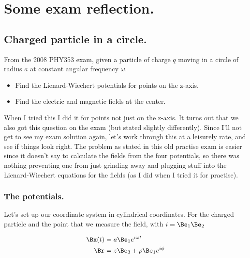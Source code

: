 
%

\chapter{Some exam reflection.}
\label{chap:relativisticElectrodynamicsExamReflection}
{}
\date{April 13, 2011}

\beginArtWithToc

\section{Charged particle in a circle.}

From the 2008 PHY353 exam, given a particle of charge $q$ moving in a circle of radius $a$ at constant angular frequency $\omega$.

\begin{itemize}
\item Find the Lienard-Wiechert potentials for points on the z-axis.
\item Find the electric and magnetic fields at the center.
\end{itemize}

When I tried this I did it for points not just on the z-axis.  It turns out that we also got this question on the exam (but stated slightly differently).  Since I'll not get to see my exam solution again, let's work through this at a leisurely rate, and see if things look right.  The problem as stated in this old practise exam is easier since it doesn't say to calculate the fields from the four potentials, so there was nothing preventing one from just grinding away and plugging stuff into the Lienard-Wiechert equations for the fields (as I did when I tried it for practise).

\subsection{The potentials.}

Let's set up our coordinate system in cylindrical coordinates.  For the charged particle and the point that we measure the field, with $i = \Be_1 \Be_2$

\begin{align}\label{eqn:relativisticElectrodynamicsExamReflection:10}
\Bx(t) &= a \Be_1 e^{i \omega t} \\
\Br &= z \Be_3 + \rho \Be_1 e^{i \phi}
\end{align}

